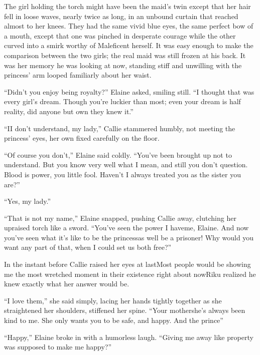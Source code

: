 The girl holding the torch might have been the maid's twin except that her hair fell in loose waves, nearly twice as long, in an unbound curtain that reached almost to her knees. They had the same vivid blue eyes, the same perfect bow of a mouth, except that one was pinched in desperate courage while the other curved into a smirk worthy of Maleficent herself. It was easy enough to make the comparison between the two girls; the real maid was still frozen at his back. It was her memory he was looking at now, standing stiff and unwilling with the princess' arm looped familiarly about her waist.

``Didn't you enjoy being royalty?'' Elaine asked, smiling still. ``I thought that was every girl's dream. Though you're luckier than most; even your dream is half reality, did anyone but own they knew it.''

``I\textemdash I don't understand, my lady,'' Callie stammered humbly, not meeting the princess' eyes, her own fixed carefully on the floor.

``Of course you don't,'' Elaine said coldly. ``You've been brought up not to understand. But you know very well what I mean, and still you don't question. Blood is power, you little fool. Haven't I always treated you as the sister you are?''

``Yes, my lady.''

``That is not my name,'' Elaine snapped, pushing Callie away, clutching her upraised torch like a sword. ``You've seen the power I have\textemdash me, Elaine. And now you've seen what it's like to be the princess\textemdash as well be a prisoner! Why would you want any part of that, when I could set us both free?''

In the instant before Callie raised her eyes at last\textemdash Most people would be showing me the most wretched moment in their existence right about now\textemdash Riku realized he knew exactly what her answer would be.

``I love them,'' she said simply, lacing her hands tightly together as she straightened her shoulders, stiffened her spine. ``Your mother\textemdash she's always been kind to me. She only wants you to be safe, and happy. And the prince\textemdash ''

``Happy,'' Elaine broke in with a humorless laugh. ``Giving me away like property was supposed to make me happy?''

